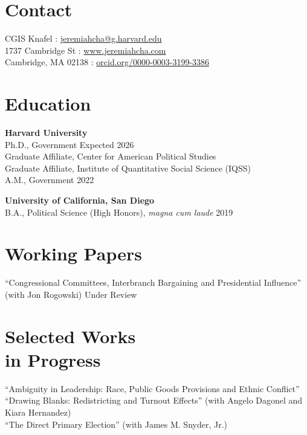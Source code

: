 \documentclass[margin, line]{res}
\begin{document}
\begin{resume}

\section{Contact}
CGIS Knafel \hfill \Letter: \href{mailto:jeremiahcha@g.harvard.edu}{jeremiahcha@g.harvard.edu}\\
1737 Cambridge St \hfill \Mundus: \href{httsp://www.jeremiahcha.com}{www.jeremiahcha.com}\\
Cambridge, MA 02138 \hfill \Mundus: \href{https://orcid.org/0000-0003-3199-3386}{orcid.org/0000-0003-3199-3386}

\section{Education}
\textbf{Harvard University}\\
\hspace*{5mm} Ph.D., Government \hfill Expected 2026\\
\hspace*{10mm}Graduate Affiliate, Center for American Political Studies\\
\hspace*{10mm}Graduate Affiliate, Institute of Quantitative Social Science (IQSS)\\
\hspace*{5mm} A.M., Government \hfill 2022

\textbf{University of California, San Diego}\\
\hspace*{5mm} B.A., Political Science (High Honors), \textit{magna cum laude} \hfill 2019

\section{Working Papers}
``Congressional Committees, Interbranch Bargaining and Presidential Influence'' (with Jon Rogowski) \hfill Under Review

\section{Selected Works \\in Progress}
``Ambiguity in Leadership: Race, Public Goods Provisions and Ethnic Conflict''\\
``Drawing Blanks: Redistricting and Turnout Effects'' (with Angelo Dagonel and Kiara Hernandez)\\
``The Direct Primary Election'' (with James M. Snyder, Jr.)



\end{resume}
\end{document}
